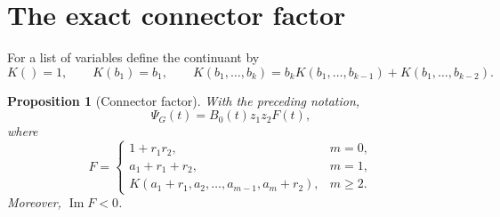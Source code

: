 \documentclass[11pt]{article}
\newtheorem{proposition}[theorem]{Proposition}
\theoremstyle{remark}
\begin{document}
\section{The exact connector factor}

For a list of variables define the continuant by
\begin{equation}\label{eq:continuant}
 K()=1,\qquad K(b_1)=b_1,\qquad
 K(b_1,\ldots,b_k)=b_kK(b_1,\ldots,b_{k-1})
                    +K(b_1,\ldots,b_{k-2}).
\end{equation}

\begin{proposition}[Connector factor]\label{prop:connector}
With the preceding notation,
\begin{equation}\label{eq:factorization}
 \Psi_G(t)=B_0(t)z_1z_2F(t),
\end{equation}
where
\begin{equation}\label{eq:F-cases}
 F=\begin{cases}
 1+r_1r_2,&m=0,\\
 a_1+r_1+r_2,&m=1,\\
 K(a_1+r_1,a_2,\ldots,a_{m-1},a_m+r_2),&m\geq2.
 \end{cases}
\end{equation}
Moreover, $\operatorname{Im}F<0$.
\end{proposition}
\end{document}
